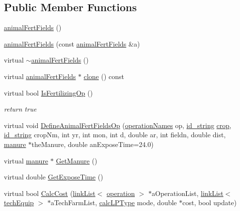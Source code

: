 \subsection*{Public Member Functions}
\begin{DoxyCompactItemize}
\item 
\hyperlink{classanimal_fert_fields_aaa7642ddd0eaf9c7cb73bb950daf1d9c}{animalFertFields} ()
\item 
\hyperlink{classanimal_fert_fields_ab09ac431c3b6c3f7d63d646b65f88d59}{animalFertFields} (const \hyperlink{classanimal_fert_fields}{animalFertFields} \&a)
\item 
virtual \hyperlink{classanimal_fert_fields_a74d1573043fe70ee33287f010c156ab1}{$\sim$animalFertFields} ()
\item 
virtual \hyperlink{classanimal_fert_fields}{animalFertFields} $\ast$ \hyperlink{classanimal_fert_fields_a086028dc45ec7c9624e80ddbb59b5271}{clone} () const 
\item 
virtual bool \hyperlink{classanimal_fert_fields_a793fca221cb66cef70bbfcb1cf124680}{IsFertilizingOp} ()
\begin{DoxyCompactList}\small\item\em return true \item\end{DoxyCompactList}\item 
virtual void \hyperlink{classanimal_fert_fields_a010ea67729173cb9e0de5aca455da205}{DefineAnimalFertFieldsOp} (\hyperlink{operation_names_8h_a77d40de6faa131199a5de6df3d9c7e3d}{operationNames} op, \hyperlink{classfield_operation_fields_a65517d20c09329343461131d07d48ecb}{id\_\-string} \hyperlink{classcrop}{crop}, \hyperlink{classfield_operation_fields_a65517d20c09329343461131d07d48ecb}{id\_\-string} cropNm, int yr, int mon, int d, double ar, int fieldn, double dist, \hyperlink{classmanure}{manure} $\ast$theManure, double anExposeTime=24.0)
\item 
virtual \hyperlink{classmanure}{manure} $\ast$ \hyperlink{classanimal_fert_fields_ab175469d12d422d2f96d60374b96402c}{GetManure} ()
\item 
virtual double \hyperlink{classanimal_fert_fields_a226a783cf10a154797837a99dc6a6896}{GetExposeTime} ()
\item 
virtual bool \hyperlink{classanimal_fert_fields_a45dd2c78a88e638206b14b82616c8e90}{CalcCost} (\hyperlink{classlink_list}{linkList}$<$ \hyperlink{classoperation}{operation} $>$ $\ast$aOperationList, \hyperlink{classlink_list}{linkList}$<$ \hyperlink{classtech_equip}{techEquip} $>$ $\ast$aTechFarmList, \hyperlink{typer_8h_af05cf854fc14086a0d6404be5ae9813f}{calcLPType} mode, double $\ast$cost, bool update)

\end{DoxyCompactItemize}
